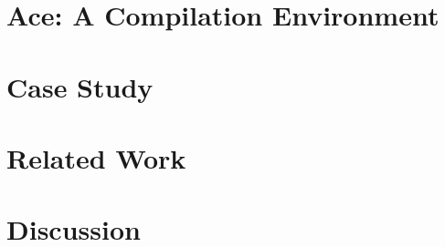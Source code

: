 \documentclass{sig-alternate}
\begin{document}
\section{Ace: A Compilation Environment}\label{compenv}
\section{Case Study}\label{casestudy}
\section{Related Work}\label{related}
\section{Discussion}\label{discussion}
%
%
\end{document}
